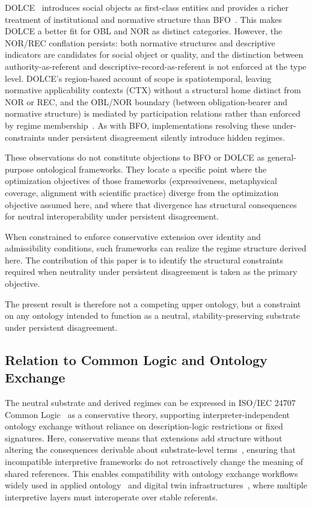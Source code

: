 DOLCE~\citep{gangemi2002dolce} introduces social objects as
first-class entities and provides a richer treatment of
institutional and normative structure than BFO~\citep{masolo2003wonderweb}.
This makes DOLCE a better fit for OBL and NOR as distinct categories.
However, the NOR/REC conflation persists: both normative structures and
descriptive indicators are candidates for social object or quality,
and the distinction between authority-as-referent and
descriptive-record-as-referent is not enforced at the type level.
DOLCE's region-based account of scope is spatiotemporal,
leaving normative applicability contexts (CTX) without a
structural home distinct from NOR or REC,
and the OBL/NOR boundary (between obligation-bearer and
normative structure) is mediated by participation relations
rather than enforced by regime membership~\citep{masolo2003wonderweb}.
As with BFO, implementations resolving these under-constraints
under persistent disagreement silently introduce hidden regimes.

These observations do not constitute objections to BFO or DOLCE
as general-purpose ontological frameworks.
They locate a specific point where the optimization objectives
of those frameworks (expressiveness, metaphysical coverage,
alignment with scientific practice) diverge from the
optimization objective assumed here,
and where that divergence has structural consequences
for neutral interoperability under persistent disagreement.

When constrained to enforce conservative extension
over identity and admissibility conditions,
such frameworks can realize the regime structure derived here.
The contribution of this paper is to identify the structural constraints
required when neutrality under persistent disagreement is taken as the primary objective.

The present result is therefore not a competing upper ontology,
but a constraint on any ontology intended to function as a
neutral, stability-preserving substrate under persistent disagreement.

\subsection{Relation to Common Logic and Ontology Exchange}

The neutral substrate and derived regimes can be
expressed in ISO/IEC 24707 Common Logic~\citep{iso24707} as a conservative theory,
supporting interpreter-independent ontology exchange
without reliance on description-logic restrictions or fixed signatures.
Here, conservative means that
extensions add structure
without altering the consequences
derivable about substrate-level terms~\citep{hodges1997shorter},
ensuring that incompatible interpretive frameworks
do not retroactively change the meaning of shared references.
This enables compatibility with ontology exchange workflows
widely used in applied ontology~\citep{kutz2010carnap}
and digital twin infrastructures~\citep{grieves2016digital},
where multiple interpretive layers must interoperate over stable referents.

